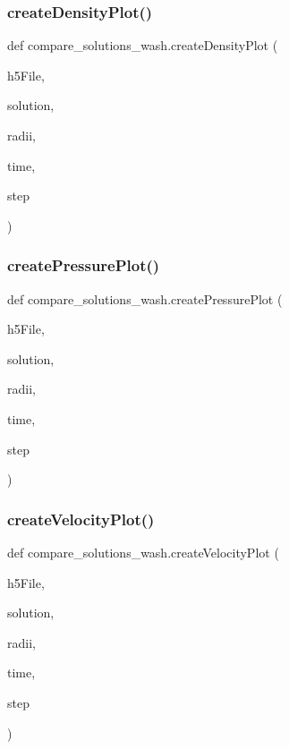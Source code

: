 \subsubsection{\texorpdfstring{create\+Density\+Plot()}{createDensityPlot()}}
{\footnotesize\ttfamily def compare\+\_\+solutions\+\_\+wash.\+create\+Density\+Plot (\begin{DoxyParamCaption}\item[{}]{h5\+File,  }\item[{}]{solution,  }\item[{}]{radii,  }\item[{}]{time,  }\item[{}]{step }\end{DoxyParamCaption})}

\mbox{\label{namespacecompare__solutions__wash_a236abe92088293534f0bce89ea79e371}} 
\subsubsection{\texorpdfstring{create\+Pressure\+Plot()}{createPressurePlot()}}
{\footnotesize\ttfamily def compare\+\_\+solutions\+\_\+wash.\+create\+Pressure\+Plot (\begin{DoxyParamCaption}\item[{}]{h5\+File,  }\item[{}]{solution,  }\item[{}]{radii,  }\item[{}]{time,  }\item[{}]{step }\end{DoxyParamCaption})}

\mbox{\label{namespacecompare__solutions__wash_aac854cee7d44cae442c294a76e83ed6a}} 
\subsubsection{\texorpdfstring{create\+Velocity\+Plot()}{createVelocityPlot()}}
{\footnotesize\ttfamily def compare\+\_\+solutions\+\_\+wash.\+create\+Velocity\+Plot (\begin{DoxyParamCaption}\item[{}]{h5\+File,  }\item[{}]{solution,  }\item[{}]{radii,  }\item[{}]{time,  }\item[{}]{step }\end{DoxyParamCaption})}

